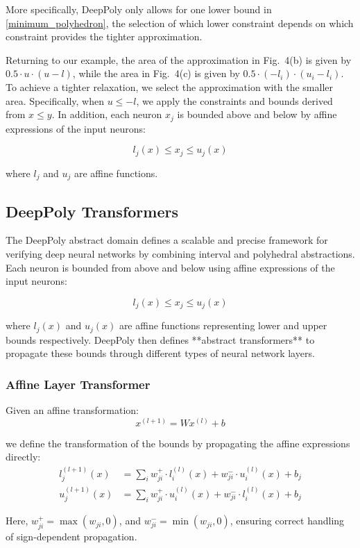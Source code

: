 \documentclass[oneside,11pt,dvipsnames]{book}
\begin{document}
More specifically,  DeepPoly only allows for one lower bound in \ref{minimum_polyhedron}, the selection of which lower constraint depends on which constraint provides the tighter approximation.

Returning to our example, the area of the approximation in Fig.~4(b) is given by \( 0.5 \cdot u \cdot (u - l) \), while the area in Fig.~4(c) is given by \( 0.5 \cdot (-l_i) \cdot (u_i - l_i) \). To achieve a tighter relaxation, we select the approximation with the smaller area. Specifically, when \( u \leq -l \), we apply the constraints and bounds derived from \(x \leq y\).
In addition, each neuron \(x_j\) is bounded above and below by affine expressions of the input neurons:

\[
l_j(x) \leq x_j \leq u_j(x)
\]

where \(l_j\) and \(u_j\) are affine functions.

\subsection{DeepPoly Transformers}

The DeepPoly abstract domain defines a scalable and precise framework for verifying deep neural networks by combining interval and polyhedral abstractions. Each neuron is bounded from above and below using affine expressions of the input neurons:

\[
l_j(x) \leq x_j \leq u_j(x)
\]

where \(l_j(x)\) and \(u_j(x)\) are affine functions representing lower and upper bounds respectively. DeepPoly then defines **abstract transformers** to propagate these bounds through different types of neural network layers.

\subsubsection{Affine Layer Transformer}

Given an affine transformation:
\[
x^{(l+1)} = W x^{(l)} + b
\]

we define the transformation of the bounds by propagating the affine expressions directly:
\begin{align*}
l_j^{(l+1)}(x) &= \sum_i w_{ji}^+ \cdot l_i^{(l)}(x) + w_{ji}^- \cdot u_i^{(l)}(x) + b_j \\
u_j^{(l+1)}(x) &= \sum_i w_{ji}^+ \cdot u_i^{(l)}(x) + w_{ji}^- \cdot l_i^{(l)}(x) + b_j
\end{align*}

Here, \(w^+_{ji} = \max(w_{ji}, 0)\), and \(w^-_{ji} = \min(w_{ji}, 0)\), ensuring correct handling of sign-dependent propagation.
\end{document}
